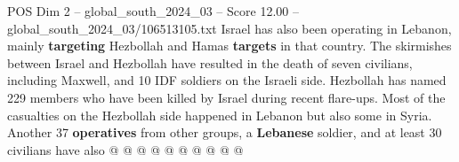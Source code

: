 \begin{textsample}{POS Dim 2 – global\_south\_2024\_03 – Score 12.00 – global\_south\_2024\_03/106513105.txt}
Israel has also been operating in Lebanon, mainly \textbf{targeting} Hezbollah and Hamas \textbf{targets} in that country.
The skirmishes between Israel and Hezbollah have resulted in the death of seven civilians, including Maxwell, and 10 IDF soldiers on the Israeli side.
Hezbollah has named 229 members who have been killed by Israel during recent flare-ups.
Most of the casualties on the Hezbollah side happened in Lebanon but also some in Syria.
Another 37 \textbf{operatives} from other groups, a \textbf{Lebanese} soldier, and at least 30 civilians have also @ @ @ @ @ @ @ @ @ @

\end{textsample}
